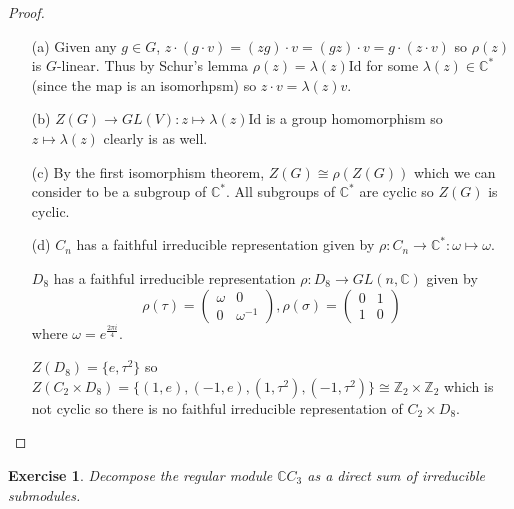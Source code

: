 \documentclass{article}
\newtheorem{exercise}[theorem]{Exercise}
\begin{document}
\begin{proof}
\begin{enumerate}
    \item[(a)] Given any $g\in G$, $z\cdot(g\cdot v)=(zg)\cdot v=(gz)\cdot v=g\cdot(z\cdot v)$ so $\rho(z)$ is $G$-linear. Thus by Schur's lemma $\rho(z)=\lambda(z)\text{Id}$ for some $\lambda(z)\in\mathbb{C}^*$ (since the map is an isomorhpsm) so $z\cdot v=\lambda(z)v$.
    \item[(b)] $Z(G)\to GL(V):z\mapsto\lambda(z)\text{Id}$ is a group homomorphism so $z\mapsto\lambda(z)$ clearly is as well.
    \item[(c)] By the first isomorphism theorem, $Z(G)\cong\rho(Z(G))$ which we can consider to be a subgroup of $\mathbb{C}^*$. All subgroups of $\mathbb{C}^*$ are cyclic so $Z(G)$ is cyclic.
    \item[(d)] $C_n$ has a faithful irreducible representation given by $\rho:C_n\to \mathbb{C}^*:\omega\mapsto\omega$. 

    $D_8$ has a faithful irreducible representation $\rho:D_8\to GL(n,\mathbb{C})$ given by\[\rho(\tau)=\begin{pmatrix}
\omega & 0 \\
0 & \omega^{-1}
\end{pmatrix},\rho(\sigma)=\begin{pmatrix}
0 & 1 \\
1 & 0
\end{pmatrix}\] where $\omega=e^\frac{2\pi i}{4}$.

$Z(D_8)=\{e,\tau^2\}$ so $Z(C_2\times D_8)=\{(1,e),(-1,e),(1,\tau^2),(-1,\tau^2)\}\cong \mathbb{Z}_2\times\mathbb{Z}_2$ which is not cyclic so there is no faithful irreducible representation of $C_2\times D_8$.
\end{enumerate}
\end{proof}

\begin{exercise}
     Decompose the regular module \( \mathbb{C}C_3 \) as a direct sum of irreducible submodules.
\end{exercise}
\end{document}
